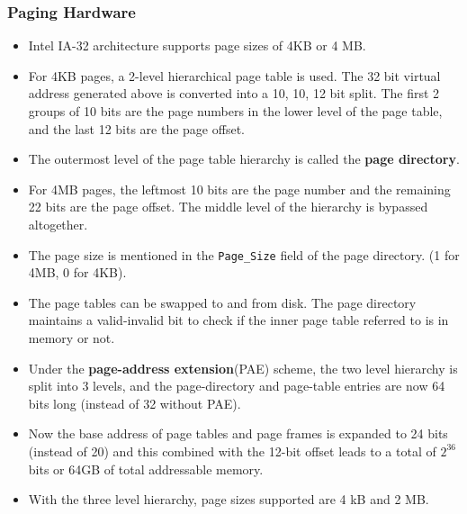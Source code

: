 \documentclass{article}
\theoremstyle{plain}
\theoremstyle{definition}
\begin{document}
\subsubsection{Paging Hardware}
    \begin{itemize}
        \item Intel IA-32 architecture supports page sizes of 4KB or 4 MB.
        
        \item For 4KB pages, a 2-level hierarchical page table is used. The 32 bit virtual address generated above is converted into a 10, 10, 12 bit split. The first 2 groups of 10 bits are the page numbers in the lower level of the page table, and the last 12 bits are the page offset. 
        
        \item The outermost level of the page table hierarchy is called the \textbf{page directory}.
        
        \item For 4MB pages, the leftmost 10 bits are the page number and the remaining 22 bits are the page offset. The middle level of the hierarchy is bypassed altogether. 
        
        \item The page size is mentioned in the \texttt{Page\_Size} field of the page directory. (1 for 4MB, 0 for 4KB).
        
        \item The page tables can be swapped to and from disk. The page directory maintains a valid-invalid bit to check if the inner page table referred to is in memory or not. 
        
        \item Under the \textbf{page-address extension}(PAE) scheme, the two level hierarchy is split into 3 levels, and the page-directory and page-table entries are now 64 bits long (instead of 32 without PAE). 
        
        \item Now the base address of page tables and page frames is expanded to 24 bits (instead of 20) and this combined with the 12-bit offset leads to a total of $2^{36}$ bits or 64GB of total addressable memory. 
        
        \item With the three level hierarchy, page sizes supported are 4 kB and 2 MB. 
    \end{itemize}
    
\end{document}
